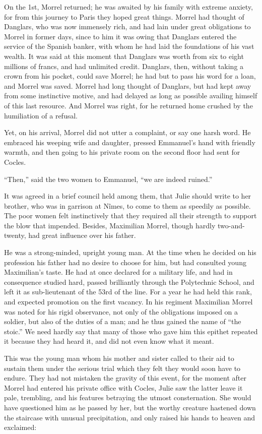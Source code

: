 On the 1st, Morrel returned; he was awaited by his family with extreme
anxiety, for from this journey to Paris they hoped great things. Morrel
had thought of Danglars, who was now immensely rich, and had lain under
great obligations to Morrel in former days, since to him it was owing
that Danglars entered the service of the Spanish banker, with whom he
had laid the foundations of his vast wealth. It was said at this moment
that Danglars was worth from six to eight millions of francs, and had
unlimited credit. Danglars, then, without taking a crown from his
pocket, could save Morrel; he had but to pass his word for a loan, and
Morrel was saved. Morrel had long thought of Danglars, but had kept
away from some instinctive motive, and had delayed as long as possible
availing himself of this last resource. And Morrel was right, for he
returned home crushed by the humiliation of a refusal.

Yet, on his arrival, Morrel did not utter a complaint, or say one harsh
word. He embraced his weeping wife and daughter, pressed Emmanuel’s
hand with friendly warmth, and then going to his private room on the
second floor had sent for Cocles.

“Then,” said the two women to Emmanuel, “we are indeed ruined.”

It was agreed in a brief council held among them, that Julie should
write to her brother, who was in garrison at Nîmes, to come to them as
speedily as possible. The poor women felt instinctively that they
required all their strength to support the blow that impended. Besides,
Maximilian Morrel, though hardly two-and-twenty, had great influence
over his father.

He was a strong-minded, upright young man. At the time when he decided
on his profession his father had no desire to choose for him, but had
consulted young Maximilian’s taste. He had at once declared for a
military life, and had in consequence studied hard, passed brilliantly
through the Polytechnic School, and left it as sub-lieutenant of the
53rd of the line. For a year he had held this rank, and expected
promotion on the first vacancy. In his regiment Maximilian Morrel was
noted for his rigid observance, not only of the obligations imposed on
a soldier, but also of the duties of a man; and he thus gained the name
of “the stoic.” We need hardly say that many of those who gave him this
epithet repeated it because they had heard it, and did not even know
what it meant.

This was the young man whom his mother and sister called to their aid
to sustain them under the serious trial which they felt they would soon
have to endure. They had not mistaken the gravity of this event, for
the moment after Morrel had entered his private office with Cocles,
Julie saw the latter leave it pale, trembling, and his features
betraying the utmost consternation. She would have questioned him as he
passed by her, but the worthy creature hastened down the staircase with
unusual precipitation, and only raised his hands to heaven and
exclaimed:

